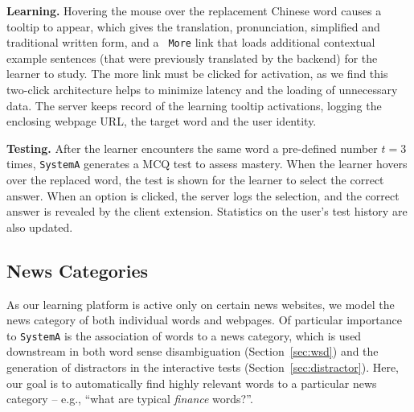 \begin{CJK}{UTF8}{gbsn}
{\bf Learning.} Hovering the mouse over the replacement Chinese word
causes a tooltip to appear, which gives the translation,
pronunciation, simplified and traditional written form, and a {\tt
  More} link that loads additional contextual example sentences (that
were previously translated by the backend) for the learner to study.
The more link must be clicked for activation, as we find this
two-click architecture helps to minimize latency and the loading of
unnecessary data.  The server keeps record of the learning tooltip
activations, logging the enclosing webpage URL, the target word and
the user identity.


{\bf Testing.}  After the learner encounters the same word a
pre-defined number $t=3$ times, {\tt SystemA} generates a MCQ test
to assess mastery.  When the learner hovers over the replaced word,
the test is shown for the learner to select the correct answer. When
an option is clicked, the server logs the selection, and the correct
answer is revealed by the client extension.  Statistics on the user's
test history are also updated.

\subsection{News Categories}
\label{subsec:category}
As our learning platform is active only on certain news websites, we
model the news category of both individual words and webpages. Of
particular importance to {\tt SystemA} is the association of words to a
news category, which is used downstream in both word sense
disambiguation (Section~\ref{sec:wsd}) and the generation of
distractors in the interactive tests (Section~\ref{sec:distractor}).
Here, our goal is to automatically find highly relevant words to a
particular news category -- e.g., ``what are typical {\it finance}
words?''.  


\end{CJK}
